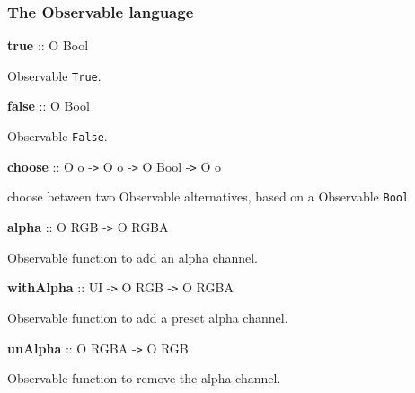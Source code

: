  

\subsubsection{The Observable language}

 

{{\bf true} :: O Bool}

\hspace{0.05\textwidth}\begin{minipage}{0.9\textwidth}Observable {\tt True}.\end{minipage}

 

{{\bf false} :: O Bool}

\hspace{0.05\textwidth}\begin{minipage}{0.9\textwidth}Observable {\tt False}.\end{minipage}

 

{{\bf choose} ::  O o -{\tt >} O o -{\tt >} O Bool -{\tt >} O o}

\hspace{0.05\textwidth}\begin{minipage}{0.9\textwidth}choose between two Observable alternatives, based on a Observable {\tt Bool}\end{minipage}

 

{{\bf alpha} :: O RGB -{\tt >} O RGBA}

\hspace{0.05\textwidth}\begin{minipage}{0.9\textwidth}Observable function to add an alpha channel.\end{minipage}

 

{{\bf withAlpha} :: UI -{\tt >} O RGB -{\tt >} O RGBA}

\hspace{0.05\textwidth}\begin{minipage}{0.9\textwidth}Observable function to add a preset alpha channel.\end{minipage}

 

{{\bf unAlpha} :: O RGBA -{\tt >} O RGB}

\hspace{0.05\textwidth}\begin{minipage}{0.9\textwidth}Observable function to remove the alpha channel.\end{minipage}

